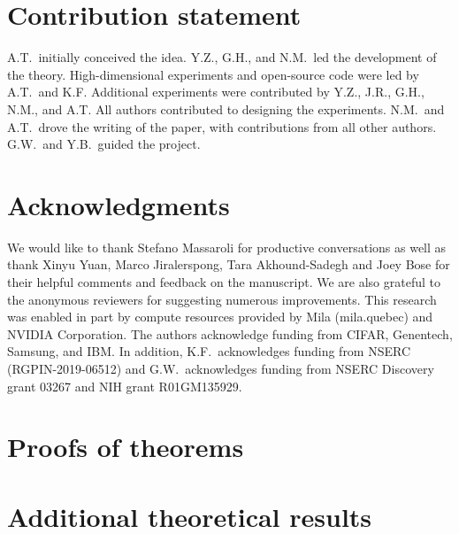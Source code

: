 \documentclass[10pt]{article}
\theoremstyle{plain}
\theoremstyle{definition}
\theoremstyle{remark}
\begin{document}
\section*{Contribution statement} A.T.\ initially conceived the idea. Y.Z., G.H., and N.M.\ led the development of the theory. High-dimensional experiments and open-source code were led by A.T.\ and K.F. Additional experiments were contributed by Y.Z., J.R., G.H., N.M., and A.T. All authors contributed to designing the experiments. N.M.\ and A.T.\ drove the writing of the paper, with contributions from all other authors. G.W.\ and Y.B.\ guided the project.

\section*{Acknowledgments}

We would like to thank Stefano Massaroli for productive conversations as well as thank Xinyu Yuan, Marco Jiralerspong, Tara Akhound-Sadegh and Joey Bose for their helpful comments and feedback on the manuscript. We are also grateful to the anonymous reviewers for suggesting numerous improvements. This research was enabled in part by compute resources provided by Mila (mila.quebec) and NVIDIA Corporation. The authors acknowledge funding from CIFAR, Genentech, Samsung, and IBM. In addition, K.F.\ acknowledges funding from NSERC (RGPIN-2019-06512) and G.W.\ acknowledges funding from NSERC Discovery grant 03267 and NIH grant R01GM135929. 




\appendix


\section{Proofs of theorems}\label{sec:proofs}
\printProofs

\section{Additional theoretical results}\label{sec:more_theory}
\end{document}
